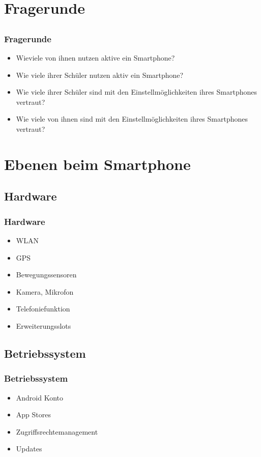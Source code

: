 \documentclass[12pt]{beamer}
\begin{document}
\section{Fragerunde}
\subsection{}

\begin{frame}
    \frametitle{Fragerunde}
    \begin{itemize}
	    \item Wieviele von ihnen nutzen aktive ein Smartphone?
	    \item Wie viele ihrer Schüler nutzen aktiv ein Smartphone?
	    \item Wie viele ihrer Schüler sind mit den Einstellmöglichkeiten ihres Smartphones vertraut?
	    \item Wie viele von ihnen sind mit den Einstellmöglichkeiten ihres Smartphones vertraut?
    \end{itemize}
\end{frame}

\section{Ebenen beim Smartphone}
\subsection{Hardware}
\begin{frame}
	\frametitle{Hardware}
	\begin{itemize}
		\item WLAN
		\item GPS
		\item Bewegungssensoren
		\item Kamera, Mikrofon
		\item Telefoniefunktion
		\item Erweiterungsslots
	\end{itemize}
\end{frame}

\subsection{Betriebssystem}
\begin{frame}
	\frametitle{Betriebssystem}
	\begin{itemize}
		\item Android Konto
		\item App Stores
		\item Zugriffsrechtemanagement
		\item Updates
	\end{itemize}
\end{frame}
\end{document}
